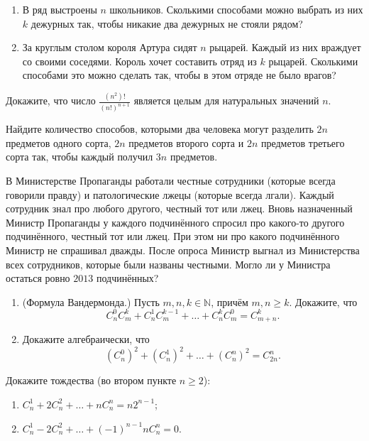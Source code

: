 \begin{problems}
\item
\begin{enumerate}
  \item[а)] В ряд выстроены $n$ школьников. Сколькими способами можно выбрать из них $k$ дежурных так, чтобы никакие два дежурных не стояли рядом?
  \item[б)] За круглым столом короля Артура сидят $n$ рыцарей. Каждый из них враждует со своими соседями. Король хочет составить отряд из $k$ рыцарей. Сколькими способами это можно сделать так, чтобы в этом отряде не было врагов?
\end{enumerate}

\item Докажите, что число $\displaystyle\frac{(n^2)!}{(n!)^{n+1}}$ является целым для натуральных значений $n$.

\item Найдите количество способов, которыми два человека могут разделить $2n$ предметов одного сорта, $2n$ предметов второго сорта и $2n$ предметов третьего сорта так, чтобы каждый получил $3n$ предметов.

\item В Министерстве Пропаганды работали честные сотрудники (которые всегда говорили правду) и патологические лжецы (которые всегда лгали). Каждый сотрудник знал про любого другого, честный тот или лжец. Вновь назначенный Министр Пропаганды у каждого подчинённого спросил про какого-то другого подчинённого, честный тот или лжец. При этом ни про какого подчинённого Министр не спрашивал дважды. После опроса Министр выгнал из Министерства всех сотрудников, которые были названы честными. Могло ли у Министра остаться ровно $2013$ подчинённых?

\item
\begin{enumerate}
  \item[а)] (Формула Вандермонда.) Пусть $m,n,k\in\mathbb N$, причём $m,n\geq k$. Докажите, что
  \[
    C_n^0C_m^k+C_n^1C_m^{k-1}+\dots+C_n^kC_m^0=C_{m+n}^k.
  \]
  \item[б)] Докажите алгебраически, что
  \[
    (C_n^0)^2+(C_n^1)^2+\dots+(C_n^n)^2=C_{2n}^n.
  \]
\end{enumerate}

\item Докажите тождества (во втором пункте $n\geq2$):
\begin{enumerate}
  \item[а)] $C_n^1+2C_n^2+\dots+nC_n^n=n2^{n-1}$;
  \item[б)] $C_n^1-2C_n^2+\dots+(-1)^{n-1}nC_n^n=0$.
\end{enumerate}


\end{problems}
